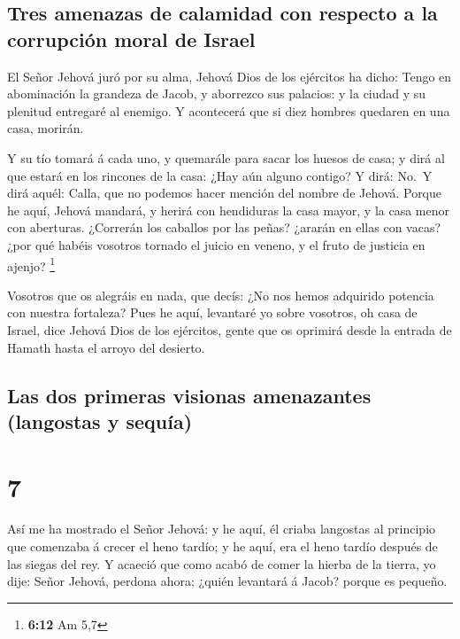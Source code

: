 \hypertarget{tres-amenazas-de-calamidad-con-respecto-a-la-corrupciuxf3n-moral-de-israel}{%
\subsection{Tres amenazas de calamidad con respecto a la corrupción
moral de
Israel}\label{tres-amenazas-de-calamidad-con-respecto-a-la-corrupciuxf3n-moral-de-israel}}

 El Señor Jehová juró por su alma, Jehová Dios de los
ejércitos ha dicho: Tengo en abominación la grandeza de Jacob, y
aborrezco sus palacios: y la ciudad y su plenitud entregaré al enemigo.
 Y acontecerá que si diez hombres quedaren en una casa,
morirán.

 Y su tío tomará á cada uno, y quemarále para sacar los
huesos de casa; y dirá al que estará en los rincones de la casa: ¿Hay
aún alguno contigo? Y dirá: No.~Y dirá aquél: Calla, que no podemos
hacer mención del nombre de Jehová.  Porque he aquí, Jehová
mandará, y herirá con hendiduras la casa mayor, y la casa menor con
aberturas.  ¿Correrán los caballos por las peñas? ¿ararán
en ellas con vacas? ¿por qué habéis vosotros tornado el juicio en
veneno, y el fruto de justicia en ajenjo? \footnote{\textbf{6:12} Am 5,7}

 Vosotros que os alegráis en nada, que decís: ¿No nos hemos
adquirido potencia con nuestra fortaleza?  Pues he aquí,
levantaré yo sobre vosotros, oh casa de Israel, dice Jehová Dios de los
ejércitos, gente que os oprimirá desde la entrada de Hamath hasta el
arroyo del desierto.

\hypertarget{las-dos-primeras-visionas-amenazantes-langostas-y-sequuxeda}{%
\subsection{Las dos primeras visionas amenazantes (langostas y
sequía)}\label{las-dos-primeras-visionas-amenazantes-langostas-y-sequuxeda}}

\hypertarget{section-6}{%
\section{7}\label{section-6}}

 Así me ha mostrado el Señor Jehová: y he aquí, él criaba
langostas al principio que comenzaba á crecer el heno tardío; y he aquí,
era el heno tardío después de las siegas del rey.  Y acaeció
que como acabó de comer la hierba de la tierra, yo dije: Señor Jehová,
perdona ahora; ¿quién levantará á Jacob? porque es pequeño.

